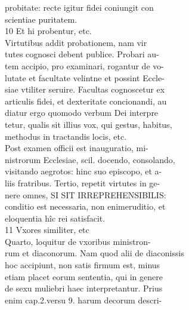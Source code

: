 \documentclass{article}
\begin{document}
\begin{pages}
                probitate: recte igitur fidei coniungit con \\
                scientiae puritatem. \\
                10 Et hi probentur, etc. \\
                Virtutibus addit probationem, nam vir \\
                tutes cognosci debent publice. Probari au- \\
                tem accipio, pro examinari, rogantur de vo- \\
                lutate et facultate velintne et possint Eccle- \\
                siae vtiliter seruire. Facultas cognoscetur ex \\
                articulis fidei, et dexteritate concionandi, au \\
                diatur ergo quomodo verbum Dei interpre \\
                tetur, qualis sit illius vox, qui gestus, habitus, \\
                methodus in tractandis locis, etc. \\
                Post examen officii est inauguratio, mi- \\
                nistrorum Ecclesiae, scil. docendo, consolando, \\
                visitando aegrotos: hinc suo episcopo, et a- \\
                liis fratribus. Tertio, repetit virtutes in ge- \\
                nere omnes, SI SIT IRREPREHENSIBILIS: \\
                conditio est necessaria, non enimeruditio, et \\
                eloquentia hîc rei satisfacit. \\
                11 Vxores similiter, etc \\
                Quarto, loquitur de vxoribus ministron- \\
                rum et diaconorum. Nam quod alii de diaconissis \\
                hoc accipiunt, non satis firmum est, minus \\
                etiam placet eorum sententia, qui in genere \\
                de sexu muliebri haec interpretantur. Prius \\
                enim cap.2.versu 9. harum decorum descri- \\

\end{pages}
\end{document}
